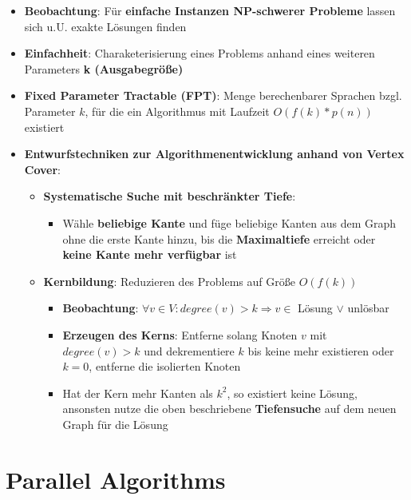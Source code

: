 \documentclass[10pt,a4paper]{article}
\begin{document}
	\begin{itemize}
		\item \textbf{Beobachtung}: Für \textbf{einfache Instanzen NP-schwerer Probleme} lassen sich u.U. exakte Lösungen finden
		\item \textbf{Einfachheit}: Charaketerisierung eines Problems anhand eines weiteren Parameters \textbf{k (Ausgabegröße)}
		\item \textbf{Fixed Parameter Tractable (FPT)}: Menge berechenbarer Sprachen bzgl. Parameter $k$, für die ein Algorithmus mit Laufzeit $O(f(k) * p(n))$ existiert
		\item \textbf{Entwurfstechniken zur Algorithmenentwicklung anhand von Vertex Cover}:
		\begin{itemize}
			\item \textbf{Systematische Suche mit beschränkter Tiefe}:
		 	\begin{itemize}
		 		\item Wähle \textbf{beliebige Kante} und füge beliebige Kanten aus dem Graph ohne die erste Kante hinzu, bis die \textbf{Maximaltiefe} erreicht oder \textbf{keine Kante mehr verfügbar} ist
		 	\end{itemize}
		 	\item \textbf{Kernbildung}: Reduzieren des Problems auf Größe $O(f(k))$
		 	\begin{itemize}
		 		\item \textbf{Beobachtung}: $\forall v \in V: degree(v) > k \Rightarrow v \in$ Lösung $\lor$ unlösbar
		 		\item \textbf{Erzeugen des Kerns}: Entferne solang Knoten $v$ mit $degree(v) > k$ und dekrementiere $k$ bis keine mehr existieren oder $k = 0$, entferne die isolierten Knoten
		 		\item Hat der Kern mehr Kanten als $k^2$, so existiert keine Lösung, ansonsten nutze die oben beschriebene \textbf{Tiefensuche} auf dem neuen Graph für die Lösung
		 	\end{itemize}
		 \end{itemize} 
	\end{itemize}

	\section{Parallel Algorithms}
	\label{pa:sec:parallel_algorithms}
	
\end{document}
